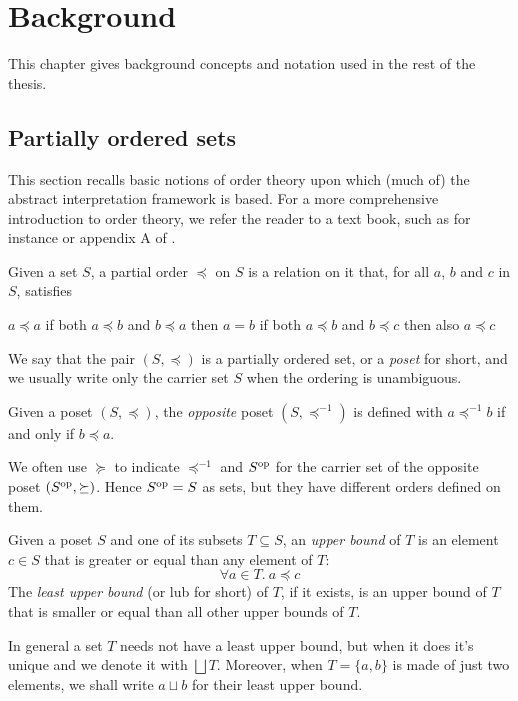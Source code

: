 \chapter{Background}
This chapter gives background concepts and notation used in the rest of the thesis.

\section{Partially ordered sets}
This section recalls basic notions of order theory upon which (much of) the abstract interpretation framework is based. For a more comprehensive introduction to order theory, we refer the reader to a text book, such as for instance \cite{order-theory-book} or appendix A of \cite{principles-of-program-analysis-book}.

\begin{definition}
	Given a set $S$, a partial order $\preceq$ on $S$ is a relation on it that, for all $a$, $b$ and $c$ in $S$, satisfies
	\begin{itemize}
		 $a \preceq a$
		 if both $a \preceq b$ and $b \preceq a$ then $a = b$
		 if both $a \preceq b$ and $b \preceq c$ then also $a \preceq c$
	\end{itemize}
\end{definition}
We say that the pair $(S, \preceq)$ is a partially ordered set, or a \textit{poset} for short, and we usually write only the carrier set $S$ when the ordering is unambiguous.

\begin{definition}
	Given a poset $(S, \preceq)$, the \textit{opposite} poset $(S, \preceq^{-1})$ is defined with $a \preceq^{-1} b$ if and only if $b \preceq a$.
\end{definition}
We often use $\succeq$ to indicate $\preceq^{-1}$ and $S^{\text{op}}$ for the carrier set of the opposite poset $(S^{\text{op}}, \succeq)$. Hence $S^{\text{op}} = S$ as sets, but they have different orders defined on them.

\begin{definition}
	Given a poset $S$ and one of its subsets $T \subseteq S$, an \textit{upper bound} of $T$ is an element $c \in S$ that is greater or equal than any element of $T$:
	\[
	\forall a \in T.\ a \preceq c
	\]
	The \textit{least upper bound} (or lub for short) of $T$, if it exists, is an upper bound of $T$ that is smaller or equal than all other upper bounds of $T$.
\end{definition}
In general a set $T$ needs not have a least upper bound, but when it does it's unique and we denote it with $\bigsqcup T$. Moreover, when $T = \{ a, b \}$ is made of just two elements, we shall write $a \sqcup b$ for their least upper bound.

